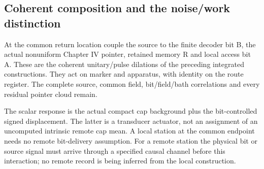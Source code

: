 \subsection{Coherent composition and the noise/work distinction}
At the common return location couple the source to the finite decoder
bit B, the actual nonuniform Chapter IV pointer, retained memory R and
local access bit A. These are the coherent unitary/pulse dilations of
the preceding integrated constructions. They act on marker and apparatus,
with identity on the route register. The complete source, common field,
bit/field/bath correlations and every residual pointer cloud remain.

The scalar response is the actual compact cap background plus the
bit-controlled signed displacement. The latter is a transducer actuator,
not an assignment of an uncomputed intrinsic remote cap mean. A local
station at the common endpoint needs no remote bit-delivery assumption.
For a remote station the physical bit or source signal must arrive through
a specified causal channel before this interaction; no remote record is
being inferred from the local construction.

